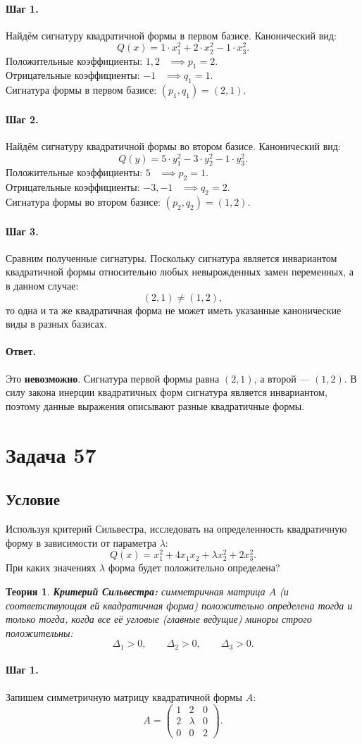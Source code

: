 \documentclass[12pt,a4paper]{article}
\theoremstyle{solution}
\newtheorem*{theory}{Теория}
\newcommand{\task}[1]{\newpage\section*{Задача #1}}
\newcommand{\answer}{\paragraph{Ответ.}}
\newcommand{\step}[1]{\paragraph{Шаг #1.}}
\begin{document}
\step{1} Найдём сигнатуру квадратичной формы в первом базисе. Канонический вид:
\[
Q(x) = 1\cdot x_1^2 + 2\cdot x_2^2 - 1\cdot x_3^2.
\]
Положительные коэффициенты: $1, 2$ \ $\implies p_1 = 2$. \\
Отрицательные коэффициенты: $-1$ \ $\implies q_1 = 1$. \\
Сигнатура формы в первом базисе: $(p_1, q_1) = (2, 1)$.

\step{2} Найдём сигнатуру квадратичной формы во втором базисе. Канонический вид:
\[
Q(y) = 5\cdot y_1^2 - 3\cdot y_2^2 - 1\cdot y_3^2.
\]
Положительные коэффициенты: $5$ \ $\implies p_2 = 1$. \\
Отрицательные коэффициенты: $-3, -1$ \ $\implies q_2 = 2$. \\
Сигнатура формы во втором базисе: $(p_2, q_2) = (1, 2)$.

\step{3} Сравним полученные сигнатуры. Поскольку сигнатура является инвариантом квадратичной формы относительно любых невырожденных замен переменных, а в данном случае:
\[
(2, 1) \neq (1, 2),
\]
то одна и та же квадратичная форма не может иметь указанные канонические виды в разных базисах.

\answer
Это \textbf{невозможно}. Сигнатура первой формы равна $(2, 1)$, а второй — $(1, 2)$. В силу закона инерции квадратичных форм сигнатура является инвариантом, поэтому данные выражения описывают разные квадратичные формы.

\task{57}
\subsection*{Условие}
Используя критерий Сильвестра, исследовать на определенность квадратичную форму в зависимости от параметра $\lambda$:
\[
Q(x) = x_1^2 + 4x_1 x_2 + \lambda x_2^2 + 2x_3^2.
\]
При каких значениях $\lambda$ форма будет положительно определена?

\begin{theory}
\textbf{Критерий Сильвестра:} симметричная матрица $A$ (и соответствующая ей квадратичная форма) положительно определена тогда и только тогда, когда все её угловые (главные ведущие) миноры строго положительны:
\[
\Delta_1 > 0, \qquad \Delta_2 > 0, \qquad \Delta_3 > 0.
\]
\end{theory}

\step{1} Запишем симметричную матрицу квадратичной формы $A$:
\[
A = \begin{pmatrix} 1 & 2 & 0 \\ 2 & \lambda & 0 \\ 0 & 0 & 2 \end{pmatrix}.
\]
\end{document}
